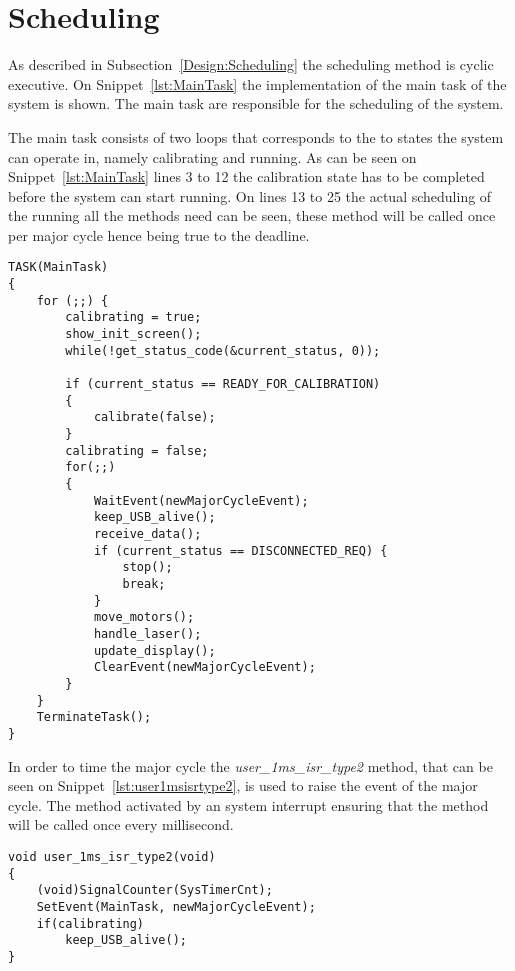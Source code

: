 \section{Scheduling}\label{solution:scheduling}
As described in Subsection~\ref{Design:Scheduling} the scheduling method is cyclic executive. 
On Snippet~\ref{lst:MainTask} the implementation of the main task of the system is shown. 
The main task are responsible for the scheduling of the  system.

The main task consists of two loops that corresponds to the to states the system can operate in, namely calibrating and running.
As can be seen on Snippet~\ref{lst:MainTask} lines 3 to 12 the calibration state has to be completed before the system can start running. 
On lines 13 to 25 the actual scheduling of the running all the methods need can be seen, these method will be called once per major cycle hence being true to the deadline. 

\begin{lstlisting}[language=CSharp,label={lst:MainTask},caption={MainTaks method from logic.c}]
TASK(MainTask)
{
    for (;;) {
        calibrating = true;
        show_init_screen();
        while(!get_status_code(&current_status, 0));

        if (current_status == READY_FOR_CALIBRATION)
        {
            calibrate(false);
        }
        calibrating = false;
        for(;;)
        {
            WaitEvent(newMajorCycleEvent);
            keep_USB_alive();
            receive_data();
            if (current_status == DISCONNECTED_REQ) {
                stop();
                break;
            }
            move_motors();
            handle_laser();
            update_display();
            ClearEvent(newMajorCycleEvent); 
        }
    }
    TerminateTask();
}
\end{lstlisting}

In order to time the major cycle the \textit{user\_1ms\_isr\_type2} method, that can be seen on Snippet~\ref{lst:user1msisrtype2}, is used to raise the event of the major cycle. 
The method activated by an system interrupt ensuring that the method will be called once every millisecond. 
\begin{lstlisting}[language=CSharp,label={lst:user1msisrtype2},caption={user\_1ms\_isr\_type2 method from nxt.c}]
void user_1ms_isr_type2(void)
{
    (void)SignalCounter(SysTimerCnt);
    SetEvent(MainTask, newMajorCycleEvent);
    if(calibrating)
        keep_USB_alive();
}
\end{lstlisting}

